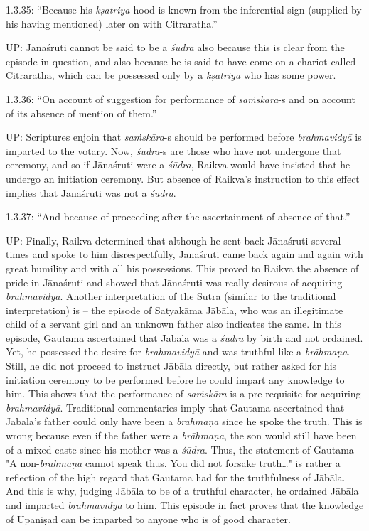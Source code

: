 1.3.35: “Because his \textit{kṣatriya-}hood is known from the inferential sign (supplied by his having mentioned) later on with Citraratha.”

UP: Jānaśruti cannot be said to be a \textit{śūdra} also because this is clear from the episode in question, and also because he is said to have come on a chariot called Citraratha, which can be possessed only by a \textit{kṣatriya} who has some power.

1.3.36: “On account of suggestion for performance of \textit{saṁskāra}-s and on account of its absence of mention of them.”

UP: Scriptures enjoin that \textit{saṁskāra}-s should be performed before \textit{brahmavidyā} is imparted to the votary. Now, \textit{śūdra}-s are those who have not undergone that ceremony, and so if Jānaśruti were a \textit{śūdra}, Raikva would have insisted that he undergo an initiation ceremony. But absence of Raikva's instruction to this effect implies that Jānaśruti was not a \textit{śūdra}.

1.3.37: “And because of proceeding after the ascertainment of absence of that.”

\newpage

UP: Finally, Raikva determined that although he sent back Jānaśruti several times and spoke to him disrespectfully, Jānaśruti came back again and again with great humility and with all his possessions. This proved to Raikva the absence of pride in Jānaśruti and showed that Jānaśruti was really desirous of acquiring \textit{brahmavidyā}. Another interpretation of the Sūtra (similar to the traditional interpretation) is – the episode of Satyakāma Jābāla, who was an illegitimate child of a servant girl and an unknown father also indicates the same. In this episode, Gautama ascertained that Jābāla was a \textit{śūdra} by birth and not ordained. Yet, he possessed the desire for \textit{brahmavidyā} and was truthful like a \textit{brāhmaṇa}. Still, he did not proceed to instruct Jābāla directly, but rather asked for his initiation ceremony to be performed before he could impart any knowledge to him. This shows that the performance of \textit{saṁskāra} is a pre-requisite for acquiring \textit{brahmavidyā}. Traditional commentaries imply that Gautama ascertained that Jābāla's father could only have been a \textit{brāhmaṇa} since he spoke the truth. This is wrong because even if the father were a \textit{brāhmaṇa}, the son would still have been of a mixed caste since his mother was a \textit{śūdra}. Thus, the statement of Gautama- "A non-\textit{brāhmaṇa} cannot speak thus. You did not forsake truth…" is rather a reflection of the high regard that Gautama had for the truthfulness of Jābāla. And this is why, judging Jābāla to be of a truthful character, he ordained Jābāla and imparted \textit{brahmavidyā} to him. This episode in fact proves that the knowledge of Upaniṣad can be imparted to anyone who is of good character.

